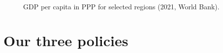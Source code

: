 \documentclass[12pt,english]{article}
\begin{document}


\begin{figure}[h!]
  \caption{GDP per capita in PPP for selected regions (2021, World Bank).}\label{fig:GDPpc}
\end{figure}


\section{Our three policies}
\end{document}
